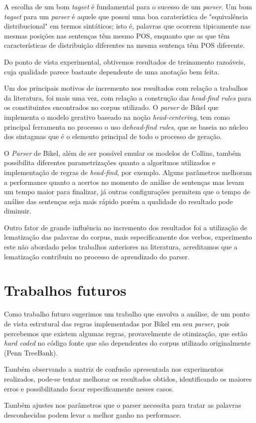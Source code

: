 A escolha de um bom \emph{tagset} é fundamental para o sucesso de um \emph{parser}. Um bom \emph{tagset} para um \emph{parser} é aquele que possui uma boa caraterística de "equivalência distribucional" em termos sintáticos; isto é, palavras que ocorrem tipicamente nas mesmas posições nas sentenças têm mesmo POS, enquanto que as que têm características de distribuição diferentes na mesma sentença têm POS diferente. 

Do ponto de vista experimental, obtivemos resultados de treinamento razoáveis, cuja qualidade parece bastante dependente de uma anotação bem feita. 

Um dos principais motivos de incremento nos resultados com relação a trabalhos da literatura, foi mais uma vez, com relação a construção das \emph{head-find rules} para os constituintes encontrados no corpus utilizado. O \emph{parser} de Bikel que implementa o modelo gerativo baseado na noção \emph{head-centering}, tem como principal ferramenta no processo o uso de\emph{head-find rules}, que se baseia no núcleo dos sintagmas que é o elemento principal de todo o processo de geração.

O \emph{Parser} de Bikel, além de ser possível emular os modelos de Collins, também possibilita diferentes parametrizações quanto a algoritmos utilizados e implementação de regras de \emph{head-find}, por exemplo. Alguns parâmetros melhoram a performance quanto a acertos no momento de análise de sentenças mas levam um tempo maior para finalizar, já outras configurações permitem que o tempo de análise das sentenças seja mais rápido porém a qualidade do resultado pode diminuir.

Outro fator de grande influência no incremento dos resultados foi a utilização de lematização das palavras do corpus, mais especificamente dos verbos, experimento este não abordado pelos trabalhos anteriores na literatura, acreditamos que a lematização contribuiu no processo de aprendizado do parser.

\section{Trabalhos futuros}
\label{sec:trabalhos_futuros}

Como trabalho futuro sugerimos um trabalho que envolva a análise, de um ponto de vista estrutural das regras implementadas por Bikel em seu \emph{parser}, pois percebemos que existem algumas regras, provavelmente de otimização, que estão \emph{hard coded } no código fonte que são dependentes do corpus utilizado originalmente (Penn TreeBank). 

Também observando a matriz de confusão apresentada nos experimentos realizados, pode-se tentar melhorar os resultados obtidos, identificando os maiores erros e possibilitando focar especificamente nesses casos. 

Também ajustes nos parâmetros que o parser necessita para tratar as palavras desconhecidas podem levar a melhor ganho na performace.
